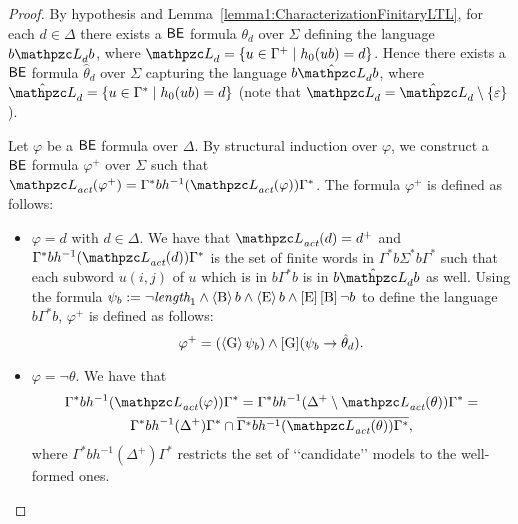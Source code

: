   \begin{proof} By hypothesis and Lemma~\ref{lemma1:CharacterizationFinitaryLTL}, for each $d\in \Delta$ there exists a
  $\mathsf{BE}$ formula $\theta_d$ over $\Sigma$ defining the language $b \Lang_d b$, where $\Lang_d =\{u\in \Gamma^{+}\mid h_0(ub)= d\}$.
  Hence there exists a
  $\mathsf{BE}$ formula $\hat{\theta}_d$ over $\Sigma$ capturing the language $b \hat{\Lang}_d b$, where $\hat{\Lang}_d =\{u\in \Gamma^{*}\mid h_0(ub)= d\}$ (note that
 $\Lang_d= \hat{\Lang}_d\setminus\{\varepsilon\}$).

 Let $\varphi$ be a  $\mathsf{BE}$ formula over $\Delta$. By structural induction over $\varphi$, we construct a $\mathsf{BE}$ formula $\varphi^{+}$ over $\Sigma$
 such that $\Lang_\act(\varphi^{+})= \Gamma^{*}b h^{-1}(\Lang_\act(\varphi))\Gamma^{*}$.
The formula $\varphi^{+}$ is defined as follows:
\begin{itemize}
  \item $\varphi= d$ with $d\in \Delta$. We have that $\Lang_\act(d)=d^{+}$ and $\Gamma^{*}b h^{-1}(\Lang_\act(d))\Gamma^{*}$ is the set of finite words in
  $\Gamma^{*}b \Sigma^{*} b\Gamma^{*}$ such that each subword $u(i,j)$ of $u$ which is in $b\Gamma^{*}b$ is in $b\hat{\Lang}_d b$ as well. Using the formula  $\psi_b:= \neg \textit{length}_1 \wedge \operatorname{\langle B\rangle} b \wedge \operatorname{\langle E\rangle} b \wedge \operatorname{\mathopen[ E \mathclose]}\operatorname{\mathopen[ B \mathclose]}\neg b$ to define the language $b\Gamma^{*}b$, $\varphi^{+}$ is defined as follows:
  \[
  \varphi^{+} =(\operatorname{\langle G\rangle}\psi_b) \wedge \operatorname{\mathopen[ G \mathclose]}(\psi_b \rightarrow \hat{\theta}_d).
  \]
  \item $\varphi = \neg \theta$. We have that
  \begin{multline*}
 \Gamma^{*}b h^{-1}(\Lang_\act(\varphi))\Gamma^{*} = 
 \Gamma^{*}b h^{-1}(\Delta^+ \setminus \Lang_\act(\theta))\Gamma^{*} = \\
 \Gamma^{*}b h^{-1}(\Delta^+)\Gamma^{*} \cap \overline{\Gamma^{*}b  h^{-1}(\Lang_\act(\theta))\Gamma^{*}}, 
  \end{multline*}
  where $\Gamma^{*}b h^{-1}(\Delta^+)\Gamma^{*}$ restricts the set of \lq\lq candidate\rq\rq{} models to the well-formed ones.
  

\end{itemize}
\end{proof}
